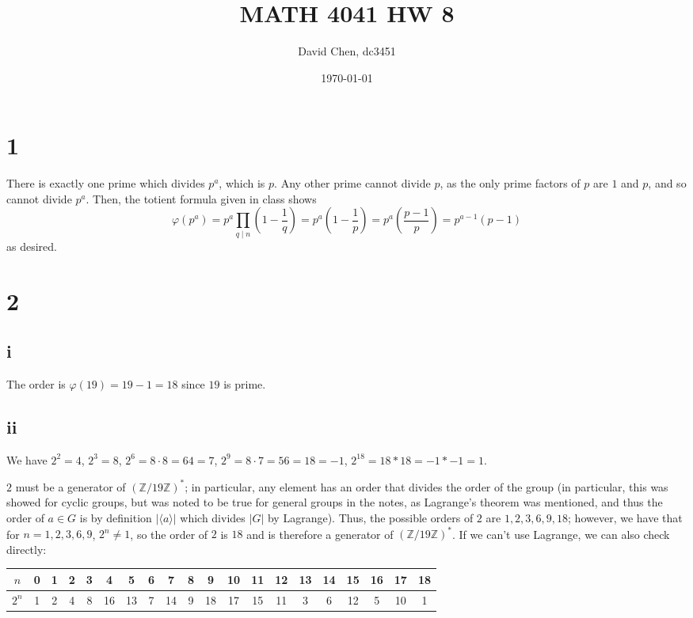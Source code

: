 \documentclass[12pt,letterpaper]{article}
\title{MATH 4041 HW 8}
\author{David Chen, dc3451}
\date{\today}
\theoremstyle{definition}
\newcommand{\Z}{\mathbb{Z}}
\begin{document}
\maketitle

\section*{1}

There is exactly one prime which divides $p^{a}$, which is $p$. Any other prime cannot divide $p$, as the only prime factors of $p$ are $1$ and $p$, and so cannot divide $p^{a}$. Then, the totient formula given in class shows
\[
  \varphi(p^{a}) = p^{a}\prod_{q \mid n}\left(1 - \frac{1}{q}\right) = p^{a}\left(1 - \frac{1}{p}\right) = p^{a}\left(\frac{p - 1}{p}\right) = p^{a-1}(p-1)
\]
as desired.

\section*{2}

\subsection*{i}

The order is $\varphi(19) = 19 - 1 = 18$ since $19$ is prime.

\subsection*{ii}

We have $2^{2} = 4$, $2^{3} = 8$, $2^{6} = 8 \cdot 8 = 64 = 7$, $2^{9} = 8 \cdot 7 = 56 = 18 = -1$, $2^{18} = 18 * 18 = -1 * -1 = 1$.

$2$ must be a generator of $(\Z/19\Z)^{*}$; in particular, any element has an order that divides the order of the group (in particular, this was showed for cyclic groups, but was noted to be true for general groups in the notes, as Lagrange's theorem was mentioned, and thus the order of $a \in G$ is by definition $|\langle a \rangle|$ which divides $|G|$ by Lagrange). Thus, the possible orders of $2$ are $1,2,3,6,9,18$; however, we have that for $n = 1,2,3,6,9$, $2^{n} \neq 1$, so the order of $2$ is $18$ and is therefore a generator of $(\Z/19\Z)^{*}$. If we can't use Lagrange, we can also check directly:
\begin{center}
  \begin{tabular}{c|c|c|c|c|c|c|c|c|c|c|c|c|c|c|c|c|c|c|c}
    $n$ & 0 & 1 & 2 & 3 & 4 & 5 & 6 & 7 & 8 & 9 & 10 & 11 & 12 & 13 & 14 & 15 & 16 & 17 & 18\\ \hline
    $2^{n}$ & 1 & 2 & 4 & 8 & 16 & 13 & 7 & 14 & 9 & 18 & 17 & 15 & 11 & 3 & 6 & 12 & 5 & 10 & 1
  \end{tabular}
\end{center}
\end{document}
